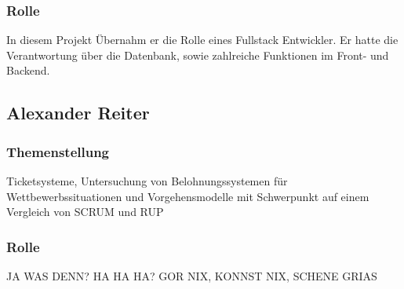 \subsubsection{Rolle}
In diesem Projekt Übernahm er die Rolle eines Fullstack Entwickler. Er hatte die Verantwortung über die Datenbank, 
sowie zahlreiche Funktionen im Front- und Backend. 

\subsection{Alexander Reiter}
\subsubsection{Themenstellung}
Ticketsysteme, Untersuchung von Belohnungssystemen für Wettbewerbssituationen und Vorgehensmodelle mit Schwerpunkt auf einem Vergleich von SCRUM und RUP
\subsubsection{Rolle}
JA WAS DENN? HA HA HA? GOR NIX, KONNST NIX, SCHENE GRIAS

\newpage